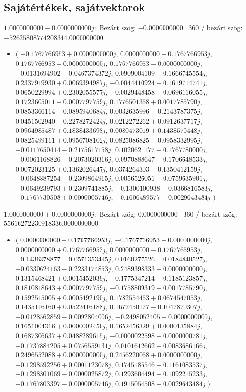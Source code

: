 \documentclass[14pt,a4paper]{article}
\begin{document}
\subsection{Sajátértékek, sajátvektorok}
$1.0000000000-0.0000000000j$:\
Bezárt szög: $-0.0000000000$ \
360 / bezárt szög: $-52625808774208344.0000000000$\
\begin{itemize}
\item
$\big($
$-0.1767766953+0.0000000000j$, $0.0000000000+0.1767766953j$, $0.1767766953-0.0000000000j$, $0.1767766953-0.0000000000j$, $-0.0131694902-0.0467374372j$, $0.0909004109-0.1666745554j$, $0.2337919930+0.0069394987j$, $-0.0044410924+0.1619714741j$, $0.0650229994+0.2302055577j$, $-0.0029448458+0.0696116055j$, $0.1723605011-0.0007797759j$, $0.1776501368+0.0017785790j$, $0.0853366114-0.0895940684j$, $0.0032635996-0.2143787375j$, $0.0451502940-0.2278272424j$, $0.0212272262+0.0912637717j$, $0.0964985487+0.1838433698j$, $0.0080473019+0.1438570448j$, $0.0825499111+0.0956708102j$, $0.0825086825-0.0958332995j$, $-0.0117650414-0.2175617158j$, $0.1020621177+0.1767780000j$, $-0.0061168826-0.2073020316j$, $0.0970888647-0.1706648533j$, $0.0072023125+0.1362026447j$, $0.0374264303-0.1350412159j$, $-0.0648887254-0.2309864915j$, $0.0056526051-0.0759635901j$, $-0.0649239793+0.2309741885j$, $-0.1300100938+0.0366816583j$, $-0.1767730508+0.0000005746j$, $-0.1606489577+0.0029643484j$
$\big)$
\end{itemize}
$1.0000000000+0.0000000000j$:\
Bezárt szög: $0.0000000000$ \
360 / bezárt szög: $55616272230918336.0000000000$\
\begin{itemize}
\item
$\big($
$0.0000000000+0.1767766953j$, $-0.1767766953+0.0000000000j$, $0.0000000000+0.1767766953j$, $0.0000000000-0.1767766953j$, $-0.1436378877-0.0571353495j$, $0.0160277526+0.0184840527j$, $-0.0330624163-0.2233174853j$, $0.2489398333+0.0000000000j$, $0.1315468421+0.0015452039j$, $-0.1775347214-0.1185123857j$, $0.1810818643+0.0007797759j$, $-0.1758809319+0.0017785790j$, $0.1592515005+0.0005492190j$, $0.1782554463+0.0674547053j$, $0.1435116160+0.0522416188j$, $0.1672450177-0.1047870307j$, $-0.0128562859-0.0092804006j$, $-0.2498052405+0.0000000000j$, $0.1651004316+0.0000002459j$, $0.1652456329+0.0000135884j$, $0.1687306637+0.0488289615j$, $-0.0000022598+0.0000000781j$, $-0.1737884205+0.0756559131j$, $0.0101612662+0.0083686166j$, $0.2496552088+0.0000000000j$, $0.2456220068+0.0000000000j$, $-0.1298592256+0.0001123078j$, $0.1745185546+0.1161083537j$, $-0.1298301069-0.0000025872j$, $0.1293604494+0.1092215233j$, $-0.1767803397-0.0000005746j$, $0.1915054508+0.0029643484j$
$\big)$
\end{itemize}
\end{document}
